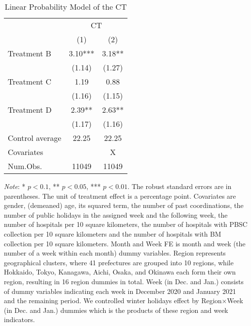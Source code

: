 \documentclass[12pt, a4paper]{article}
\begin{document}
\begin{table}[H]

\caption{\label{tab:test-lm}Linear Probability Model of the CT}
\centering
\fontsize{8}{10}\selectfont
\begin{threeparttable}
\begin{tabular}[t]{lcc}
\toprule
\multicolumn{1}{c}{ } & \multicolumn{2}{c}{CT} \\
\cmidrule(l{3pt}r{3pt}){2-3}
  & (1) & (2)\\
\midrule
Treatment B & \num{3.10}*** & \num{3.18}**\\
 & (\num{1.14}) & (\num{1.27})\\
Treatment C & \num{1.19} & \num{0.88}\\
 & (\num{1.16}) & (\num{1.15})\\
Treatment D & \num{2.39}** & \num{2.63}**\\
 & (\num{1.17}) & (\num{1.16})\\
\midrule
Control average & 22.25 & 22.25\\
Covariates &  & X\\
Num.Obs. & \num{11049} & \num{11049}\\
\bottomrule
\end{tabular}
\begin{tablenotes}
\item \emph{Note}: * $p < 0.1$, ** $p < 0.05$, *** $p < 0.01$. The robust standard errors are in parentheses. The unit of treatment effect is a percentage point. Covariates are gender, (demeaned) age, its squared term, the number of past coordinations, the number of public holidays in the assigned week and the following week, the number of hospitals per 10 square kilometers, the number of hospitals with PBSC collection per 10 square kilometers and the number of hospitals with BM collection per 10 square kilometers. Month and Week FE is month and week (the number of a week within each month) dummy variables. Region represents geographical clusters, where 41 prefectures are grouped into 10 regions, while Hokkaido, Tokyo, Kanagawa, Aichi, Osaka, and Okinawa each form their own region, resulting in 16 region dummies in total. Week (in Dec. and Jan.) consists of dummy variables indicating each week in December 2020 and January 2021 and the remaining period. We controlled winter holidays effect by Region$\times$Week (in Dec. and Jan.) dummies which is the products of these region and week indicators.
\end{tablenotes}
\end{threeparttable}
\end{table}
\end{document}
